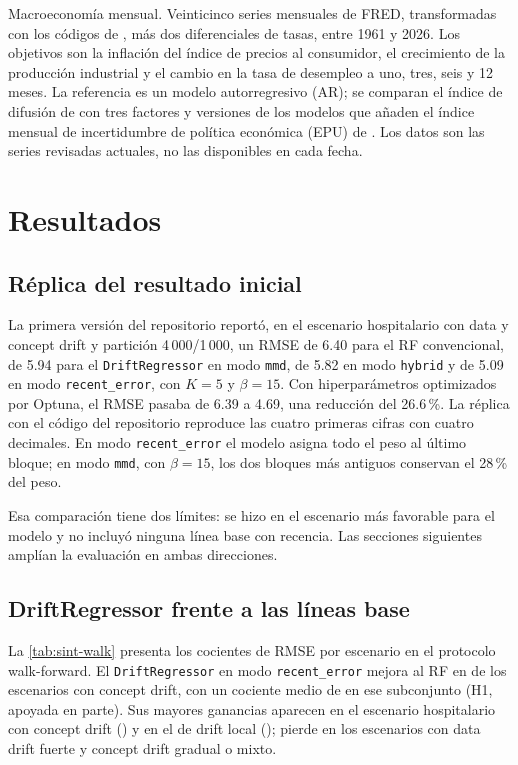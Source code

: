 \documentclass[11pt,a4paper]{article}
\begin{document}
Macroeconomía mensual. Veinticinco series mensuales de FRED, transformadas con los códigos de
\textcite{mccracken2016}, más dos diferenciales de tasas, entre 1961 y 2026. Los objetivos son la
inflación del índice de precios al consumidor, el crecimiento de la producción industrial y el cambio
en la tasa de desempleo a uno, tres, seis y 12 meses. La referencia es un modelo autorregresivo (AR);
se comparan el índice de difusión de \textcite{stockwatson2002} con tres factores y versiones de los
modelos que añaden el índice mensual de incertidumbre de política económica (EPU) de
\textcite{baker2016}. Los datos son las series revisadas actuales, no las disponibles en cada fecha.

\section{Resultados}\label{sec:resultados}

\subsection{Réplica del resultado inicial}\label{sec:res-replica}

La primera versión del repositorio reportó, en el escenario hospitalario con data y concept drift y
partición 4\,000/1\,000, un RMSE de 6.40 para el RF convencional, de 5.94 para el
\texttt{DriftRegressor} en modo \texttt{mmd}, de 5.82 en modo \texttt{hybrid} y de 5.09 en modo
\texttt{recent\_error}, con $K=5$ y $\beta=15$. Con hiperparámetros optimizados por Optuna, el RMSE
pasaba de 6.39 a 4.69, una reducción del 26.6\,\%. La réplica con el código del repositorio reproduce
las cuatro primeras cifras con cuatro decimales. En modo \texttt{recent\_error} el modelo asigna
todo el peso al último bloque; en modo \texttt{mmd}, con $\beta=15$, los dos bloques más antiguos
conservan el 28\,\% del peso.

Esa comparación tiene dos límites: se hizo en el escenario más favorable para el modelo y no incluyó
ninguna línea base con recencia. Las secciones siguientes amplían la evaluación en ambas direcciones.

\subsection{DriftRegressor frente a las líneas base}\label{sec:res-dr}

La \cref{tab:sint-walk} presenta los cocientes de RMSE por escenario en el protocolo walk-forward. El
\texttt{DriftRegressor} en modo \texttt{recent\_error} mejora al RF en \hUnoGana{} de los \nConcept{}
escenarios con concept drift, con un cociente medio de \hUnoGeo{} en ese subconjunto (H1, apoyada en
parte). Sus mayores ganancias aparecen en el escenario hospitalario con concept drift
(\xDRrHealthcareConceptWalk) y en el de drift local (\xDRrLocalDriftWalk); pierde en los escenarios
con data drift fuerte y concept drift gradual o mixto.
\end{document}
